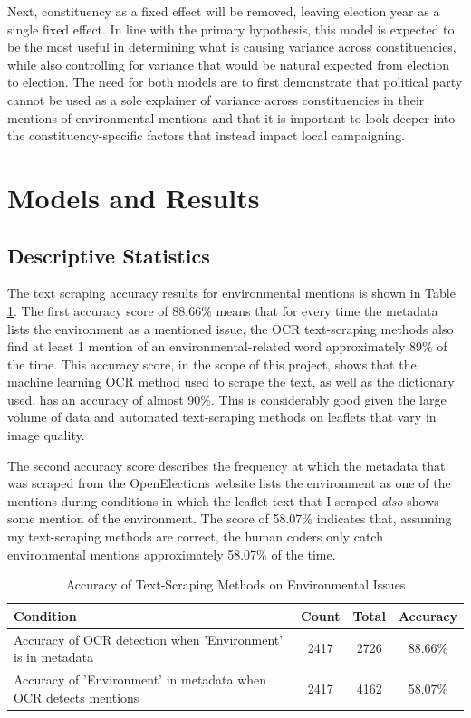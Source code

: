 \documentclass[preprint]{elsarticle} %
\begin{document}
Next, constituency as a fixed effect will be removed, leaving election year as a single fixed effect. In line with the primary hypothesis, this model is expected to be the most useful in determining what is causing variance across constituencies, while also controlling for variance that would be natural expected from election to election. The need for both models are to first demonstrate that political party cannot be used as a sole explainer of variance across constituencies in their mentions of environmental mentions and that it is important to look deeper into the constituency-specific factors that instead impact local campaigning.
	
\newpage

\section{Models and Results}


\subsection{Descriptive Statistics}


The text scraping accuracy results for environmental mentions is shown in Table~ \ref{tab:envaccuracy}. The first accuracy score of 88.66\% means that for every time the metadata lists the environment as a mentioned issue, the OCR text-scraping methods also find at least 1 mention of an environmental-related word approximately 89\% of the time. This accuracy score, in the scope of this project, shows that the machine learning OCR method used to scrape the text, as well as the dictionary used, has an accuracy of almost 90\%. This is considerably good given the large volume of data and automated text-scraping methods on leaflets that vary in image quality.

The second accuracy score describes the frequency at which the metadata that was scraped from the OpenElections website lists the environment as one of the mentions during conditions in which the leaflet text that I scraped \textit{also} shows some mention of the environment. The score of 58.07\% indicates that, assuming my text-scraping methods are correct, the human coders only catch environmental mentions approximately 58.07\% of the time. 




\vspace{0.5cm}

\begin{table}[!htbp]  
	\caption{Accuracy of Text-Scraping Methods on Environmental Issues} 
	\label{tab:envaccuracy} 
	\begin{tabularx}{\textwidth}{Xccc}
		\hline
		Condition & Count & Total & Accuracy \\ 
		\hline
		Accuracy of OCR detection when 'Environment' is in metadata & 2417 & 2726 & 88.66\% \\
		Accuracy of 'Environment' in metadata when OCR detects mentions & 2417 & 4162 & 58.07\% \\
		\hline
	\end{tabularx}
\end{table}
\end{document}
